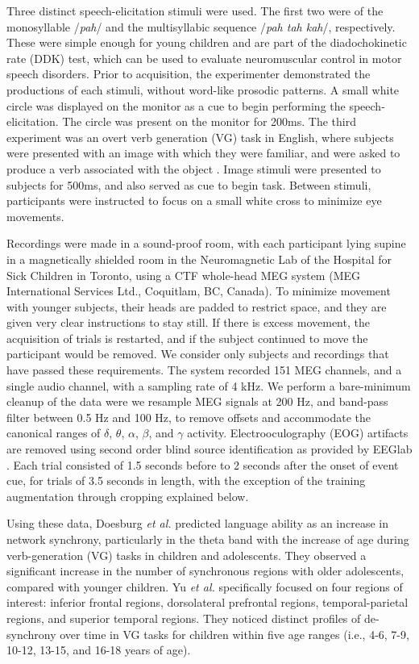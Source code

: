 \documentclass[fleqn,10pt]{wlscirep}
\begin{document}
Three distinct speech-elicitation stimuli were used. The first two were of the monosyllable /{\em pah}/ and the multisyllabic sequence /{\em pah tah kah}/, respectively. These were simple enough for young children and are part of the diadochokinetic rate (DDK) test, which can be used to evaluate neuromuscular control in motor speech disorders. Prior to acquisition, the experimenter demonstrated the productions of each stimuli, without word-like prosodic patterns. A small white circle was displayed on the monitor as a cue to begin performing the speech-elicitation. The circle was present on the monitor for 200ms. The third experiment was an overt verb generation (VG) task in English, where subjects were presented with an image with which they were familiar, and were asked to produce a verb associated with the object \cite{Doesburg2016}. Image stimuli were presented to subjects for 500ms, and also served as cue to begin task. Between stimuli, participants were instructed to focus on a small white cross to minimize eye movements.

Recordings were made in a sound-proof room, with each participant lying supine in a magnetically shielded room in the Neuromagnetic Lab of the Hospital for Sick Children in Toronto, using a CTF whole-head MEG system (MEG International Services Ltd., Coquitlam, BC, Canada). To minimize movement with younger subjects, their heads are padded to restrict space, and they are given very clear instructions to stay still. If there is excess movement, the acquisition of trials is restarted, and if the subject continued to move the participant would be removed. We consider only subjects and recordings that have passed these requirements. The system recorded 151 MEG channels, and a single audio channel, with a sampling rate of 4 kHz. We perform a bare-minimum cleanup of the data were we resample MEG signals at 200 Hz, and band-pass filter between 0.5 Hz and 100 Hz, to remove offsets and accommodate the canonical ranges of $\delta$, $\theta$, $\alpha$, $\beta$, and $\gamma$ activity. Electrooculography (EOG) artifacts are removed using second order blind source identification as provided by EEGlab \cite{Delorme04eeglab}. Each trial consisted of 1.5 seconds before to 2 seconds after the onset of event cue, for trials of 3.5 seconds in length, with the exception of the training augmentation through cropping explained below.

Using these data, Doesburg {\em et al.} \cite{Doesburg2016} predicted language ability as an increase in network synchrony, particularly in the theta band with the increase of age during verb-generation (VG) tasks in children and adolescents. They observed a significant increase in the number of synchronous regions with older adolescents, compared with younger children. Yu {\em et al.} \cite{Yu2014} specifically focused on four regions of interest: inferior frontal regions, dorsolateral prefrontal regions, temporal-parietal regions, and superior temporal regions. They noticed distinct profiles of de-synchrony over time in VG tasks for children within five age ranges (i.e., 4-6, 7-9, 10-12, 13-15, and 16-18 years of age).
\end{document}
